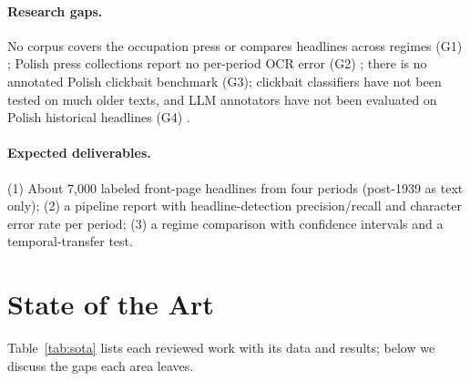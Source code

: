 \documentclass[11pt]{article}
\begin{document}
\paragraph{Research gaps.}
No corpus covers the occupation press or compares headlines across regimes (G1) \cite{Pawłowski_2024,ogrodniczuk-etal-2026-polish}; Polish press collections report no per-period OCR error (G2) \cite{kaye2026petroleum}; there is no annotated Polish clickbait benchmark (G3); clickbait classifiers have not been tested on much older texts, and LLM annotators have not been evaluated on Polish historical headlines (G4) \cite{andelic2025clic,dobranić2026approachesanalysinghistoricalnewspapers}.

\paragraph{Expected deliverables.}
(1) About 7,000 labeled front-page headlines from four periods (post-1939 as text only); (2) a pipeline report with headline-detection precision/recall and character error rate per period; (3) a regime comparison with confidence intervals and a temporal-transfer test.

\section{State of the Art}
Table~\ref{tab:sota} lists each reviewed work with its data and results; below we discuss the gaps each area leaves.
\end{document}
